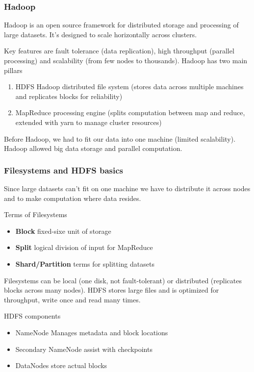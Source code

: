 \subsubsection{Hadoop}

Hadoop is an open source framework for distributed storage and processing of large datasets. It's designed to scale horizontally across clusters.

Key features are fault tolerance (data replication), high throughput (parallel processing) and scalability (from few nodes to thousands). 
Hadoop has two main pillars

\begin{enumerate}
    \item HDFS \ra Hadoop distributed file system (stores data across multiple machines and replicates blocks for reliability)
    \item MapReduce \ra processing engine (splits computation between map and reduce, extended with yarn to manage cluster resources)
\end{enumerate}

Before Hadoop, we had to fit our data into one machine (limited scalability). Hadoop allowed big data storage and parallel computation.

\subsubsection{Filesystems and HDFS basics}

Since large datasets can't fit on one machine we have to distribute it across nodes and to make computation where data resides. 

Terms of Filesystems

\begin{itemize}
    \item \textbf{Block} \ra fixed-sixe unit of storage
    \item \textbf{Split} \ra logical division of input for MapReduce
    \item \textbf{Shard/Partition} terms for splitting datasets
\end{itemize}

Filesystems can be local (one disk, not fault-tolerant) or distributed (replicates blocks across many nodes). HDFS stores large files and is optimized for throughput, write once and read many times.

\vspace{10pt}

HDFS components
\begin{itemize}
    \item NameNode \ra Manages metadata and block locations
    \item Secondary NameNode \ra assist with checkpoints
    \item DataNodes \ra store actual blocks
\end{itemize}

